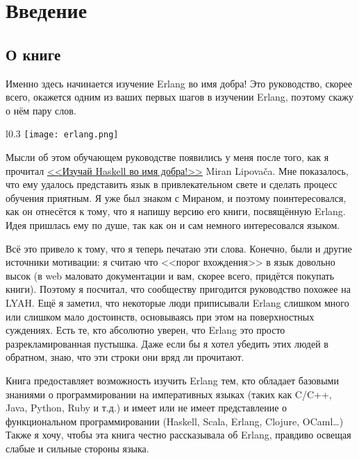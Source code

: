 \chapter{Введение}\label{introduction}

\section{О книге}

Именно здесь начинается изучение Erlang во имя добра!
Это руководство, скорее всего, окажется одним из ваших первых шагов в изучении Erlang, поэтому скажу о нём пару слов.

\begin{wrapfigure}{l}{0.3\linewidth}
    \texttt{[image: erlang.png]}
\end{wrapfigure}

Мысли об этом обучающем руководстве появились у меня после того, как я прочитал \href{http://learnyouahaskell.com}{<<Изучай Haskell во имя добра!>>} Miran Lipova\v{c}a.
Мне показалось, что ему удалось представить язык в привлекательном свете и сделать процесс обучения приятным.
Я уже был знаком с Мираном, и поэтому поинтересовался, как он отнесётся к тому, что я напишу версию его книги, посвящённую Erlang.
Идея пришлась ему по душе, так как он и сам немного интересовался языком.

Всё это привело к тому, что я теперь печатаю эти слова.
Конечно, были и другие источники мотивации: я считаю что <<порог вхождения>> в язык довольно высок (в web маловато документации и вам, скорее всего, придётся покупать книги).
Поэтому я посчитал, что сообществу пригодится руководство похожее на LYAH.
Ещё я заметил, что некоторые люди приписывали Erlang слишком много или слишком мало достоинств, основываясь при этом на поверхностных суждениях.
Есть те, кто абсолютно уверен, что Erlang это просто разрекламированная пустышка.
Даже если бы я хотел убедить этих людей в обратном, знаю, что эти строки они вряд ли прочитают.

Книга предоставляет возможность изучить Erlang тем, кто обладает базовыми знаниями о программировании на императивных языках (таких как C/C++, Java, Python, Ruby и т.д.) и имеет или не имеет представление о функциональном программировании (Haskell, Scala, Erlang, Clojure, OCaml\ldots)
Также я хочу, чтобы эта книга честно рассказывала об Erlang, правдиво освещая слабые и сильные стороны языка.


